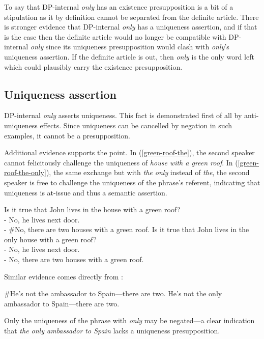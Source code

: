 To say that DP-internal \textit{only} has an existence presupposition is a bit of a stipulation as it by definition cannot be separated from the definite article. There is stronger evidence that DP-internal \textit{only} has a uniqueness assertion, and if that is the case then the definite article would no longer be compatible with DP-internal \textit{only} since its uniqueness presupposition would clash with \textit{only}'s uniqueness assertion. If the definite article is out, then \textit{only} is the only word left which could plausibly carry the existence presupposition.

\subsection{Uniqueness assertion}
DP-internal \textit{only} asserts uniqueness. This fact is demonstrated first of all by anti-uniqueness effects. Since uniqueness can be cancelled by negation in such examples, it cannot be a presupposition.

Additional evidence supports the point. In (\ref{green-roof-the}), the second speaker cannot felicitously challenge the uniqueness of \textit{house with a green roof}. In (\ref{green-roof-the-only}), the same exchange but with \textit{the only} instead of \textit{the}, the second speaker is free to challenge the uniqueness of the phrase's referent, indicating that uniqueness is at-issue and thus a semantic assertion.

\begin{exe}
	\ex \label{green-roof-the} Is it true that John lives in the house with a green roof? \\
	    - No, he lives next door. \\
	    - \#No, there are two houses with a green roof.
	\ex \label{green-roof-the-only} Is it true that John lives in the only house with a green roof? \\
	    - No, he lives next door. \\
	    - No, there are two houses with a green roof.
\end{exe}

Similar evidence comes directly from \citet{cb2015}:

\begin{exe}
	\ex \#He's not the ambassador to Spain---there are two.
	\ex He's not the only ambassador to Spain---there are two.
\end{exe}

Only the uniqueness of the phrase with \textit{only} may be negated---a clear indication that \textit{the only ambassador to Spain} lacks a uniqueness presupposition.

